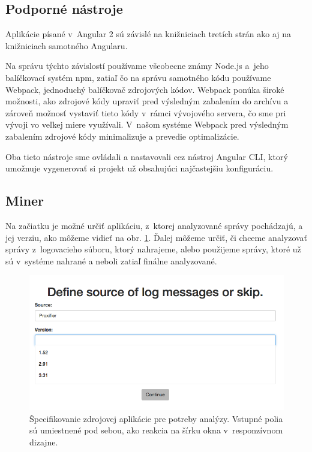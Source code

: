 \subsection{Podporné nástroje}
Aplikácie písané v~Angular 2 sú závislé na knižniciach tretích strán ako aj na knižniciach samotného Angularu.
\par Na správu týchto závislostí používame všeobecne známy Node.js a~jeho balíčkovací systém npm, zatiaľ čo na správu samotného kódu používame Webpack, jednoduchý balíčkovač zdrojových kódov. Webpack ponúka široké možnosti, ako zdrojové kódy upraviť pred výsledným zabalením do archívu a zároveň možnosť vystaviť tieto kódy v~rámci vývojového servera, čo sme pri vývoji vo veľkej miere využívali. V~našom systéme Webpack pred výsledným zabalením zdrojové kódy minimalizuje a prevedie optimalizácie.
\par Oba tieto nástroje sme ovládali a nastavovali cez nástroj Angular CLI, ktorý umožnuje vygenerovať si projekt už obsahujúci najčastejšiu konfiguráciu.


\subsection{Miner}
Na začiatku je možné určiť aplikáciu, z~ktorej analyzované správy pochádzajú, a jej verziu, ako môžeme vidieť na obr. \ref{fig:miner-source}. Ďalej môžeme určiť, či chceme analyzovať správy z~logovacieho súboru, ktorý nahrajeme, alebo použijeme správy, ktoré už sú v~systéme nahrané a neboli zatiaľ finálne analyzované.

\begin{figure}[htbp]
 \centering 
 \begin{minipage}{0.95\linewidth}
 	\centering
 	\includegraphics[width=\textwidth]{Images/thesis-miner-source.png}
 \end{minipage}
  \caption{Špecifikovanie zdrojovej aplikácie pre potreby analýzy. \mbox{Vstupné} polia sú umiestnené pod sebou, ako reakcia na šírku okna v~responzívnom dizajne.}
  \label{fig:miner-source}
\end{figure}

